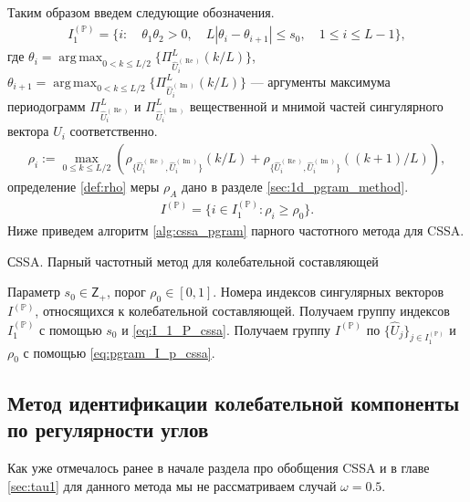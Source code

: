 \documentclass[specialist,
               substylefile = spbu.rtx,
               subf,href,colorlinks=true, 12pt]{disser}
\def\RE{\mathop{\mathrm{Re}}}
\def\argmax{\mathop{\mathrm{argmax}}}
\def\IM{\mathop{\mathrm{Im}}}
\def\argmax{\mathop{\mathrm{arg\,max}}}
\begin{document}
 
Таким образом введем следующие обозначения.  
\begin{gather} \label{eq:I_1_P_cssa}
I_1^{(\mathbb{P})} = \{ i: \quad \theta_1 \theta_2 >0, \quad L |\theta_i - \theta_{i+1}| \leqslant s_0, \quad 1 \leqslant i \leqslant L -1  \},
\end{gather}
где $\theta_i = \argmax_{0 < k \leqslant L/2} \{\Pi_{\widehat{U}^{(\RE)}_{i}}^L(k/L)\}$, $\theta_{i+1} = \argmax_{0 < k \leqslant L/2} \{\Pi_{\widehat{U}^{(\IM)}_{i}}^L(k/L)\}$ --- аргументы максимума периодограмм $\Pi_{\widehat{U}^{(\RE)}_{i}}^L$ и $\Pi_{\widehat{U}^{(\IM)}_{i}}^L$ вещественной и мнимой частей сингулярного вектора $U_i$ соответственно.
\begin{gather*}
\rho_{i} := \max_{0 \leqslant k \leqslant L/2}{\left(\rho_{\{\widehat{U}^{(\RE)}_{i},\widehat{U}^{(\IM)}_{i}\}}(k/L) + \rho_{\{\widehat{U}^{(\RE)}_{i},\widehat{U}^{(\IM)}_{i}\}}((k+1)/L)\right)},
\end{gather*}
определение \ref{def:rho} меры $\rho_A$ дано в разделе \ref{sec:1d_pgram_method}.
\begin{gather} \label{eq:pgram_I_p_cssa}
I^{(\mathbb{P})} = \{ i \in I_1^{(\mathbb{P})}: \rho_{i} \geqslant\rho_0 \}.
\end{gather}
Ниже приведем алгоритм \ref{alg:cssa_pgram} парного частотного метода для CSSA.
\begin{algorithm}[!hhh]
\caption{СSSA. Парный частотный метод для колебательной составляющей}
\label{alg:cssa_pgram}
\begin{algorithmic}[1]
\REQUIRE Параметр $s_0 \in \mathsf{Z}_{+}$, порог $\rho_0 \in [0,1]$.
\ENSURE Номера индексов сингулярных векторов $I^{(\mathbb{P})}$, относящихся к колебательной составляющей.
\STATE  Получаем группу индексов $I_1^{(\mathbb{P})}$ с помощью $s_0$ и \eqref{eq:I_1_P_cssa}.
\STATE Получаем группу $I^{(\mathbb{P})}$ по $\{\widehat{U}_j\}_{j \in I_1^{(\mathbb{P})}}$ и $\rho_0$ с помощью \eqref{eq:pgram_I_p_cssa}.
\end{algorithmic}
\end{algorithm}


\newpage
\subsection{Метод идентификации колебательной компоненты по регулярности углов}
\label{sec:tau_cssa}
Как уже отмечалось ранее в начале раздела про обобщения CSSA и в главе \ref{sec:tau1} для данного метода мы не рассматриваем случай $\omega=0.5$.
\end{document}
